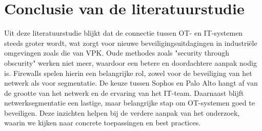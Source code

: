 \section{Conclusie van de literatuurstudie}
Uit deze literatuurstudie blijkt dat de connectie tussen OT- en IT-systemen steeds groter wordt, wat zorgt voor nieuwe beveiligingsuitdagingen in industriële omgevingen zoals die van VPK. Oude methodes zoals "security through obscurity" werken niet meer, waardoor een betere en doordachtere aanpak nodig is. Firewalls spelen hierin een belangrijke rol, zowel voor de beveiliging van het netwerk als voor segmentatie. De keuze tussen Sophos en Palo Alto hangt af van de grootte van het netwerk en de ervaring van het IT-team. Daarnaast blijft netwerksegmentatie een lastige, maar belangrijke stap om OT-systemen goed te beveiligen. Deze inzichten helpen bij de verdere aanpak van het onderzoek, waarin we kijken naar concrete toepassingen en best practices.
















